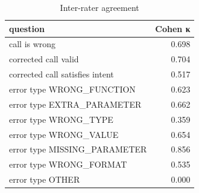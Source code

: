 \begin{table}[t]
\centering
\caption{Inter-rater agreement}
\label{tab:human_agreement}
\begin{tabular}{lr}
\hline
question & Cohen κ \\
\hline
call is wrong & 0.698 \\
corrected call valid & 0.704 \\
corrected call satisfies intent & 0.517 \\
error type WRONG\_FUNCTION & 0.623 \\
error type EXTRA\_PARAMETER & 0.662 \\
error type WRONG\_TYPE & 0.359 \\
error type WRONG\_VALUE & 0.654 \\
error type MISSING\_PARAMETER & 0.856 \\
error type WRONG\_FORMAT & 0.535 \\
error type OTHER & 0.000 \\
\hline
\end{tabular}
\end{table}
